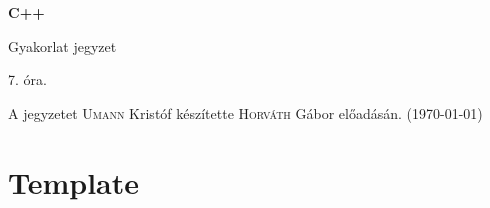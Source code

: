 \documentclass[a4paper,11.5pt]{article}
\begin{document}
	\setlength\parindent{0pt}
	\def\s{\hspace{0.2mm}\vphantom{\beta}}
	\def\Z{\mathbb{Z}}
	\def\Q{\mathbb{Q}}
	\def\R{\mathbb{R}}
	\def\C{\mathbb{C}}
	\def\N{\mathbb{N}}
	\def\Ra{\overline{\mathbb{R}}}
	
	\def\sume{\displaystyle\sum_{n=1}^{+\infty}}
	\def\sumn{\displaystyle\sum_{n=0}^{+\infty}}
	
	\def\narrow{\underset{n\rightarrow+\infty}{\longrightarrow}}
	\def\limn{\displaystyle\lim_{n\to +\infty}}
	\def\limx{\displaystyle\lim_{x\to +\infty}}
	
	\theoremstyle{definition}
	\newtheorem{theorem}{Tétel}[subsection] 
	
	\theoremstyle{definition}
	\newtheorem{definition}[theorem]{Definíció} 
	\newtheorem{example}[theorem]{Példa} 
	\newtheorem{task}[theorem]{Feladat} 
	\newtheorem{note}[theorem]{Megjegyzés}
	\begin{center}
		{\LARGE\textbf{C++}}
		
		{\Large Gyakorlat jegyzet}
		
		7. óra.
	\end{center}
	A jegyzetet \textsc{Umann} Kristóf készítette \textsc{Horváth} Gábor  előadásán. (\today)
	
	\section{Template}
\end{document}
